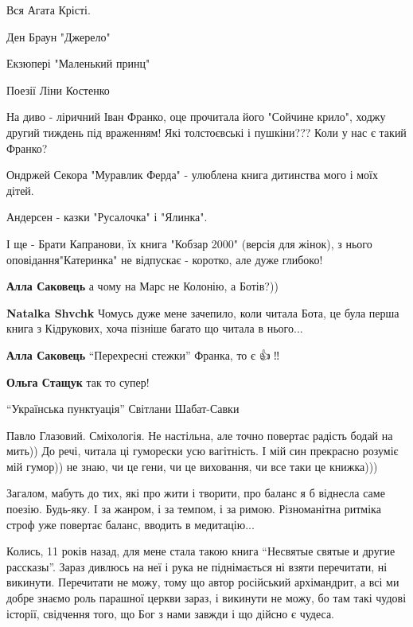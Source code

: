 Вся Агата Крісті.

Ден Браун "Джерело"

Екзюпері "Маленький принц"

Поезії Ліни Костенко

На диво - ліричний Іван Франко, оце прочитала його "Сойчине крило", ходжу
другий тиждень під враженням! Які толстоєвські і пушкіни??? Коли у нас є такий
Франко?

Ондржей Секора "Муравлик Ферда" - улюблена книга дитинства мого і моїх дітей.

Андерсен - казки "Русалочка" і "Ялинка".

І ще - Брати Капранови, їх книга "Кобзар 2000" (версія для жінок), з нього
оповідання"Катеринка" не відпускає - коротко, але дуже глибоко!

\begin{itemize} %
\textbf{Алла Саковець} а чому на Марс не Колонію, а Ботів?))

\textbf{Natalka Shvchk} Чомусь дуже мене зачепило, коли читала Бота, це була перша книга з Кідрукових, хоча пізніше багато що читала в нього...

\textbf{Алла Саковець} \enquote{Перехресні стежки} Франка, то є 👍💯‼️

\textbf{Ольга Стащук} так то супер!
\end{itemize} %


\enquote{Українська пунктуація} Світлани Шабат-Савки


Павло Глазовий. Сміхологія. Не настільна, але точно повертає радість бодай на
мить)) До речі, читала ці гуморески усю вагітність. І мій син прекрасно розуміє
мій гумор)) не знаю, чи це гени, чи це виховання, чи все таки це книжка)))

Загалом, мабуть до тих, які про жити і творити, про баланс я б віднесла саме
поезію. Будь-яку. І за жанром, і за темпом, і за римою. Різноманітна ритміка
строф уже повертає баланс, вводить в медитацію...


Колись, 11 років назад, для мене стала такою книга \enquote{Несвятые святые и другие
рассказы}. Зараз дивлюсь на неї і рука не піднімається ні взяти перечитати, ні
викинути. Перечитати не можу, тому що автор російський архімандрит, а всі ми
добре знаємо роль парашної церкви зараз, і викинути не можу, бо там такі чудові
історії, свідчення того, що Бог з нами завжди і що дійсно є чудеса.

